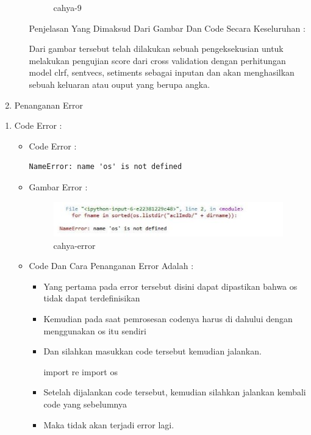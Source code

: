 \begin{enumerate}
\begin{itemize}
\begin{figure}[!hbtp]
\caption{cahya-9}
\label{cahya-9}
\end{figure}
\par
\par Penjelasan Yang  Dimaksud Dari Gambar Dan Code Secara Keseluruhan : 
\par Dari gambar tersebut telah dilakukan sebuah pengeksekusian untuk melakukan pengujian score dari cross validation dengan  perhitungan model clrf, sentvecs, setiments sebagai inputan dan akan menghasilkan sebuah keluaran atau ouput yang berupa angka.
\par
\end{itemize}
\par

\item Penanganan Error
\end{enumerate}
\begin{enumerate}
\par
\par
\item Code Error  :
\begin{itemize}
\item Code Error :
\begin{lstlisting}
NameError: name 'os' is not defined
\end{lstlisting}
\item Gambar Error :
\par
\begin{figure}[!hbtp]
\centering
\includegraphics[scale=0.3]{figures/cahya-error.jpg}
\caption{cahya-error}
\label{cahya-error}
\end{figure}
\par
\item Code Dan Cara Penanganan Error Adalah :
\begin{itemize}
\item Yang pertama pada error tersebut disini dapat dipastikan bahwa os tidak dapat terdefinisikan
\item Kemudian pada saat pemrosesan codenya harus di dahului dengan menggunakan os itu sendiri
\item Dan silahkan masukkan code tersebut kemudian jalankan.
\par
import re
import os
\item Setelah dijalankan code tersebut, kemudian silahkan jalankan kembali code yang  sebelumnya
\item Maka tidak akan terjadi error lagi.
\end{itemize}
\end{itemize}
\end{enumerate}
